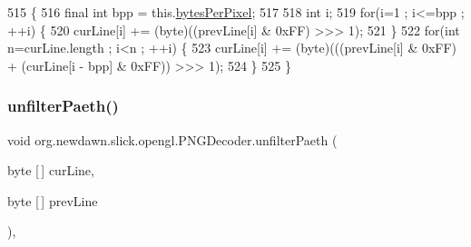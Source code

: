 \begin{DoxyCode}
515                                                                   \{
516         \textcolor{keyword}{final} \textcolor{keywordtype}{int} bpp = this.\mbox{\hyperlink{classorg_1_1newdawn_1_1slick_1_1opengl_1_1_p_n_g_decoder_aa7dcf351689be9279548b306395ee1a8}{bytesPerPixel}};
517         
518         \textcolor{keywordtype}{int} i;
519         \textcolor{keywordflow}{for}(i=1 ; i<=bpp ; ++i) \{
520             curLine[i] += (byte)((prevLine[i] & 0xFF) >>> 1);
521         \}
522         \textcolor{keywordflow}{for}(\textcolor{keywordtype}{int} n=curLine.length ; i<n ; ++i) \{
523             curLine[i] += (byte)(((prevLine[i] & 0xFF) + (curLine[i - bpp] & 0xFF)) >>> 1);
524         \}
525     \}
\end{DoxyCode}
\mbox{\label{classorg_1_1newdawn_1_1slick_1_1opengl_1_1_p_n_g_decoder_a19d3f37f70d1993a379d3573a5517b66}} 
\subsubsection{\texorpdfstring{unfilter\+Paeth()}{unfilterPaeth()}}
{\footnotesize\ttfamily void org.\+newdawn.\+slick.\+opengl.\+P\+N\+G\+Decoder.\+unfilter\+Paeth (\begin{DoxyParamCaption}\item[{byte \mbox{[}$\,$\mbox{]}}]{cur\+Line,  }\item[{byte \mbox{[}$\,$\mbox{]}}]{prev\+Line }\end{DoxyParamCaption})\hspace{0.3cm}{\ttfamily [inline]}, {\ttfamily [private]}}


